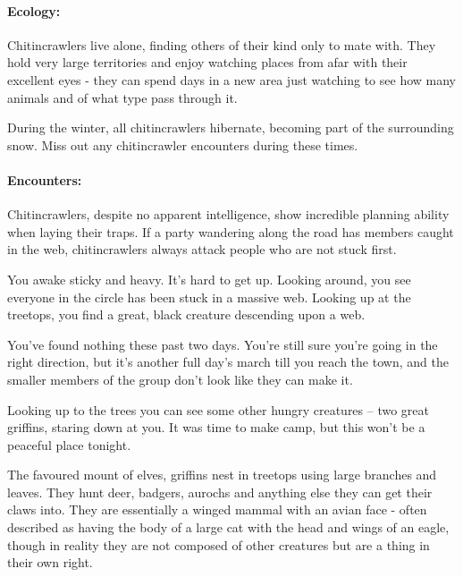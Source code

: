 	\paragraph{Ecology:} Chitincrawlers live alone, finding others of their kind only to mate with.  They hold very large territories and enjoy watching places from afar with their excellent eyes - they can spend days in a new area just watching to see how many animals and of what type pass through it.

During the winter, all chitincrawlers hibernate, becoming part of the surrounding snow.  Miss out any chitincrawler encounters during these times.

	\paragraph{Encounters:} Chitincrawlers, despite no apparent intelligence, show incredible planning ability when laying their traps.  If a party wandering along the road has members caught in the web, chitincrawlers always attack people who are not stuck first.

\begin{boxtext}
You awake sticky and heavy.  It's hard to get up.  Looking around, you see everyone in the circle has been stuck in a massive web.  Looking up at the treetops, you find a great, black creature descending upon a web.
\end{boxtext}

\label{griffin}
\griffin

\begin{boxtext}

	You've found nothing these past two days.  You're still sure you're going in the right direction, but it's another full day's march till you reach the town, and the smaller members of the group don't look like they can make it.

	Looking up to the trees you can see some other hungry creatures -- two great griffins, staring down at you.  It was time to make camp, but this won't be a peaceful place tonight.

\end{boxtext}

The favoured mount of elves, griffins nest in treetops using large branches and leaves.  They hunt deer, badgers, aurochs and anything else they can get their claws into.  They are essentially a winged mammal with an avian face - often described as having the body of a large cat with the head and wings of an eagle, though in reality they are not composed of other creatures but are a thing in their own right.

